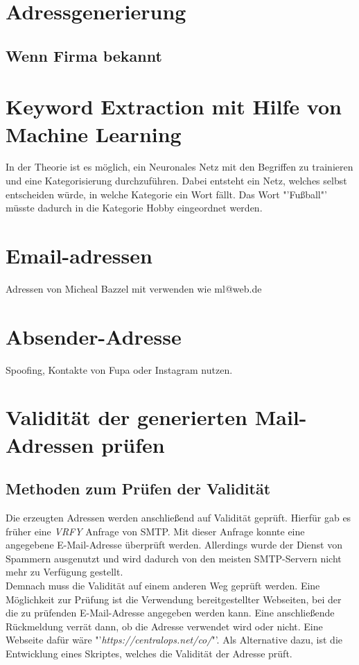 \section{Adressgenerierung}
	\subsection{Wenn Firma bekannt}
\section{Keyword Extraction mit Hilfe von Machine Learning}
\label{sec:KeywordExtractionMachine Learning}
In der Theorie ist es möglich, ein Neuronales Netz mit den Begriffen zu trainieren und eine Kategorisierung durchzuführen. Dabei entsteht ein Netz, welches selbst entscheiden würde, in welche Kategorie ein Wort fällt. Das Wort "'Fußball"' müsste dadurch in die Kategorie Hobby eingeordnet werden.

\section{Email-adressen}
Adressen von Micheal Bazzel mit verwenden wie ml@web.de

\section{Absender-Adresse}
Spoofing, Kontakte von Fupa oder Instagram nutzen.

\section{Validität der generierten Mail-Adressen prüfen}

\subsection{Methoden zum Prüfen der Validität}
Die erzeugten Adressen werden anschließend auf Validität geprüft. Hierfür gab es früher eine \textit{VRFY} Anfrage von SMTP. Mit dieser Anfrage konnte eine angegebene E-Mail-Adresse überprüft werden. Allerdings wurde der Dienst von Spammern ausgenutzt und wird dadurch von den meisten SMTP-Servern nicht mehr zu Verfügung gestellt.\cite{balduzzi2010abusing}\\
Demnach muss die Validität auf einem anderen Weg geprüft werden. Eine Möglichkeit zur Prüfung ist die Verwendung bereitgestellter Webseiten, bei der die zu prüfenden E-Mail-Adresse angegeben werden kann. Eine anschließende Rückmeldung verrät dann, ob die Adresse verwendet wird oder nicht. Eine Webseite dafür wäre "'\textit{https://centralops.net/co/}"'. Als Alternative dazu, ist die Entwicklung eines Skriptes, welches die Validität der Adresse prüft.

